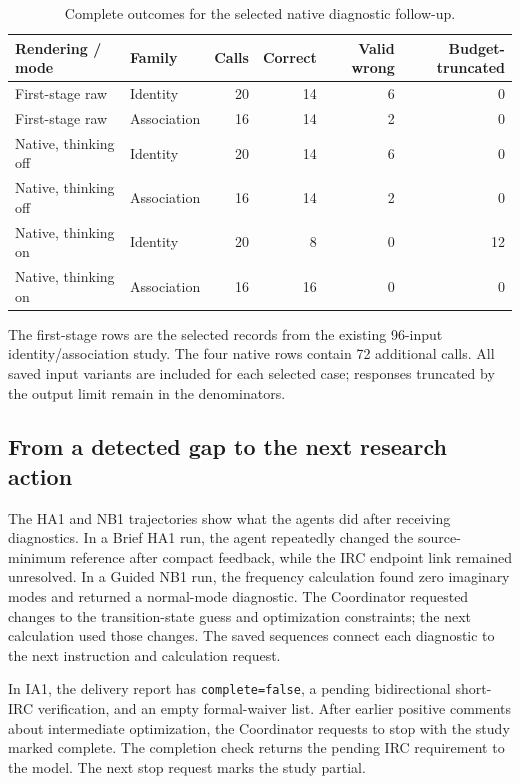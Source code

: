 \begin{table}[!htbp]
\centering\small
\caption{Complete outcomes for the selected native diagnostic follow-up.}
\label{tab:si-native-followup}
\begin{tabular}{llrrrr}
\toprule
Rendering / mode & Family & Calls & Correct & Valid wrong & Budget-truncated\\
\midrule
First-stage raw & Identity & 20 & 14 & 6 & 0\\
First-stage raw & Association & 16 & 14 & 2 & 0\\
Native, thinking off & Identity & 20 & 14 & 6 & 0\\
Native, thinking off & Association & 16 & 14 & 2 & 0\\
Native, thinking on & Identity & 20 & 8 & 0 & 12\\
Native, thinking on & Association & 16 & 16 & 0 & 0\\
\bottomrule
\end{tabular}
\par\smallskip\begin{minipage}{\linewidth}\footnotesize
The first-stage rows are the selected records from the existing 96-input identity/association study. The four native rows contain 72 additional calls. All saved input variants are included for each selected case; responses truncated by the output limit remain in the denominators.
\end{minipage}
\end{table}

\subsection{From a detected gap to the next research action}

The HA1 and NB1 trajectories show what the agents did after receiving diagnostics. In a Brief HA1 run, the agent repeatedly changed the source-minimum reference after compact feedback, while the IRC endpoint link remained unresolved. In a Guided NB1 run, the frequency calculation found zero imaginary modes and returned a normal-mode diagnostic. The Coordinator requested changes to the transition-state guess and optimization constraints; the next calculation used those changes. The saved sequences connect each diagnostic to the next instruction and calculation request.\citep{ref18}

In IA1, the delivery report has \texttt{complete=false}, a pending bidirectional short-IRC verification, and an empty formal-waiver list. After earlier positive comments about intermediate optimization, the Coordinator requests to stop with the study marked complete. The completion check returns the pending IRC requirement to the model. The next stop request marks the study partial.

